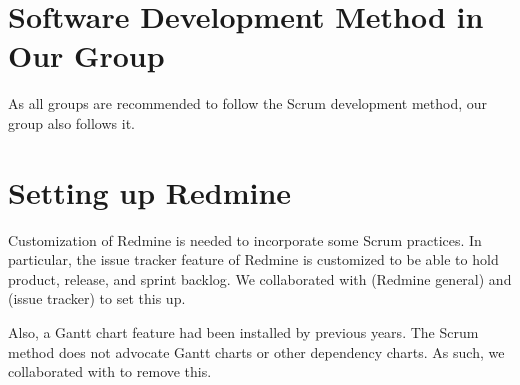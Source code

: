 \section{Software Development Method in Our Group}
As all groups are recommended to follow the Scrum development method, our group also follows it.

\section{Setting up Redmine}
Customization of Redmine is needed to incorporate some Scrum practices. In particular, the issue tracker feature of Redmine is customized to be able to hold product, release, and sprint backlog. We collaborated with  (Redmine general) and  (issue tracker) to set this up. 

Also, a Gantt chart feature had been installed by previous years. The Scrum method does not advocate Gantt charts or other dependency charts. As such, we collaborated with  to remove this.
